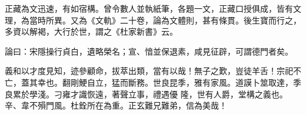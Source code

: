 \begin{pinyinscope}
 正藏為文迅速，有如宿構。曾令數人並執紙筆，各題一文，正藏口授俱成，皆有文理，為當時所異。又為《文軌》二十卷，論為文體則，甚有條貫。後生寶而行之，多資以解褐，大行於世，謂之《杜家新書》云。



 論曰：宋隱操行貞白，遺略榮名；宣、愔並保退素，咸見征辟，可謂德門者矣。



 義和以才度見知，迹參顧命，拔萃出類，當有以哉！無子之歎，豈徒羊舌！宗祀不亡，蓋其幸也。翻剛鯁自立，猛而斷務。世良昆季，雅有家風。道謨卜筮取達，季良累於學淺。刁雍才識恢遠，著聲立事，禮遇優
 隆，世有人爵，堂構之義也。辛、韋不殞門風。杜銓所在為重。正玄難兄難弟，信為美哉！



\end{pinyinscope}